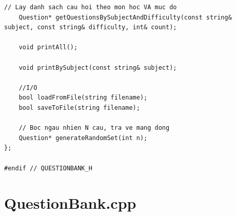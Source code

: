 \documentclass[11pt]{report}
\begin{document}
\begin{lstlisting}[caption={QuestionBank.h -- Khai báo cấu trúc câu hỏi và ngân hàng câu hỏi}, label={lst:full_qb_h}]
    // Lay danh sach cau hoi theo mon hoc VA muc do
    Question* getQuestionsBySubjectAndDifficulty(const string& subject, const string& difficulty, int& count);

    void printAll();

    void printBySubject(const string& subject);

    //I/O
    bool loadFromFile(string filename);
    bool saveToFile(string filename);

    // Boc ngau nhien N cau, tra ve mang dong
    Question* generateRandomSet(int n);
};

#endif // QUESTIONBANK_H
\end{lstlisting}

\section{QuestionBank.cpp}
\end{document}
